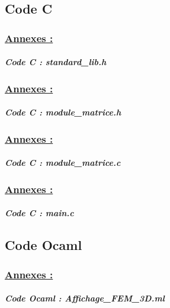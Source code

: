 \documentclass[10pt]{beamer}
\begin{document}
	\subsection{Code C}
	\begin{frame} [allowframebreaks]
		\frametitle{\uline{Annexes :}}
		\framesubtitle{\textit{Code C : standard\_lib.h}}
		
	\end{frame}
	\begin{frame}[allowframebreaks]
		\frametitle{\uline{Annexes :}}
		\framesubtitle{\textit{Code C : module\_matrice.h}}
		
	\end{frame}
	\begin{frame}[allowframebreaks]
		\frametitle{\uline{Annexes :}}
		\framesubtitle{\textit{Code C : module\_matrice.c}}
		
	\end{frame}
	\begin{frame}[allowframebreaks]
		\frametitle{\uline{Annexes :}}
		\framesubtitle{\textit{Code C : main.c}}
		
	\end{frame}
	\subsection{Code Ocaml}
	\begin{frame} [allowframebreaks]
		\frametitle{\uline{Annexes :}}
		\framesubtitle{\textit{Code Ocaml : Affichage\_FEM\_3D.ml}}
		
	\end{frame}
\end{document}
